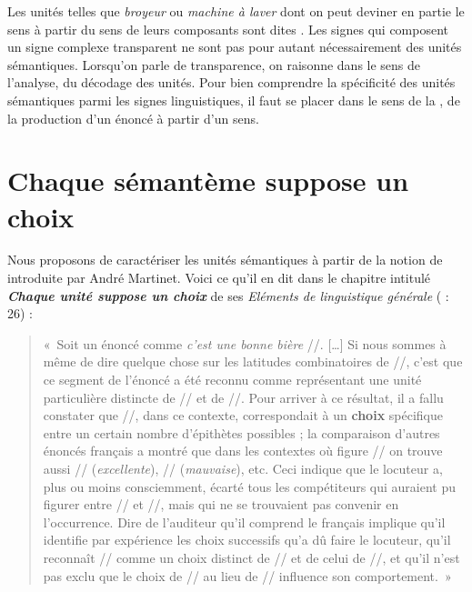 Les unités telles que \textit{broyeur} ou \textit{machine à laver} dont on peut deviner en partie le sens à partir du sens de leurs composants sont dites . Les signes qui composent un signe complexe transparent ne sont pas pour autant nécessairement des unités sémantiques. Lorsqu’on parle de transparence, on raisonne dans le sens de l’analyse, du décodage des unités. Pour bien comprendre la spécificité des unités sémantiques parmi les signes linguistiques, il faut se placer dans le sens de la , de la production d’un énoncé à partir d’un sens.

\section{Chaque sémantème suppose un choix}\label{sec:2.3.1}

Nous proposons de caractériser les unités sémantiques à partir de la notion de  introduite par André Martinet. Voici ce qu’il en dit dans le chapitre intitulé \textbf{\textit{Chaque unité suppose un choix}} de ses \textit{Eléments de linguistique générale} (\citeyear{martinet1960elements} : 26) :

\begin{quote}
    «~Soit un énoncé comme \textit{c’est une bonne bière} //. […] Si nous sommes à même de dire quelque chose sur les latitudes combinatoires de //, c’est que ce segment de l’énoncé a été reconnu comme représentant une unité particulière distincte de // et de //. Pour arriver à ce résultat, il a fallu constater que //, dans ce contexte, correspondait à un \textbf{choix} spécifique entre un certain nombre d’épithètes possibles ; la comparaison d’autres énoncés français a montré que dans les contextes où figure // on trouve aussi // (\textit{excellente}), // (\textit{mauvaise}), etc. Ceci indique que le locuteur a, plus ou moins consciemment, écarté tous les compétiteurs qui auraient pu figurer entre // et //, mais qui ne se trouvaient pas convenir en l’occurrence. Dire de l’auditeur qu’il comprend le français implique qu’il identifie par expérience les choix successifs qu’a dû faire le locuteur, qu’il reconnaît // comme un choix distinct de // et de celui de //, et qu’il n’est pas exclu que le choix de // au lieu de // influence son comportement.~»
\end{quote}

